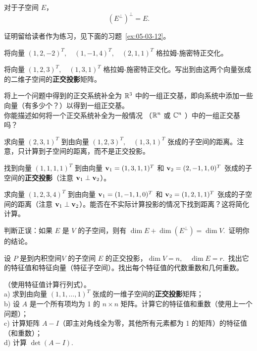 \begin{proposition}\label{stmt:05-03-06}
对于子空间 $E$，$$(E^\perp)^\perp = E.$$
\end{proposition}

证明留给读者作为练习，见下面的习题~\ref{ex:05-03-12}。

\begin{problemset}
\item \label{ex:05-03-01} 将向量 $(1, 2, -2)^T, \quad (1, -1, 4)^T, \quad (2, 1, 1)^T$ 格拉姆-施密特正交化。
\item \label{ex:05-03-02} 将向量 $(1, 2, 3)^T, \quad (1, 3, 1)^T$ 格拉姆-施密特正交化。写出到由这两个向量张成的二维子空间的\textbf{正交投影}矩阵。
\item \label{ex:05-03-03} 将上一个问题中得到的正交系统补全为 $\mathbb{R}^3$ 中的一组正交基，即向系统中添加一些向量（有多少个？）以得到一组正交基。
\\
你能描述如何将一个正交系统补全为一般情况 （$\mathbb{R}^n$ 或 $\mathbb{C}^n$ ）中的一组正交基吗？
\item \label{ex:05-03-04} 求向量 $(2, 3, 1)^T$ 到由向量 $(1, 2, 3)^T, \quad (1, 3, 1)^T$ 张成的子空间的距离。注意，只计算到子空间的距离，而不是正交投影。
\item \label{ex:05-03-05} 找到向量 $(1, 1, 1, 1)^T$ 到由向量 $\mathbf{v}_1 = (1, 3, 1, 1)^T$ 和 $\mathbf{v}_2 = (2, -1, 1, 0)^T$ 张成的子空间的\textbf{正交投影}（注意 $\mathbf{v}_1 \perp \mathbf{v}_2$）。
\item \label{ex:05-03-06} 求向量 $(1, 2, 3, 4)^T$ 到由向量 $\mathbf{v}_1 = (1, -1, 1, 0)^T$ 和 $\mathbf{v}_2 = (1, 2, 1, 1)^T$ 张成的子空间的距离（注意 $\mathbf{v}_1 \perp \mathbf{v}_2$）。能否在不实际计算投影的情况下找到距离？这将简化计算。
\item \label{ex:05-03-07} 判断正误：如果 $E$ 是 $V$ 的子空间，则有 $\dim E + \dim(E^\perp) = \dim V$.~证明你的结论。
\item \label{ex:05-03-08} 设 $P$ 是到内积空间$V$ 的子空间 $E$ 的正交投影，$\dim V = n, \quad \dim E = r$.~找出它的特征值和特征向量（特征子空间）。找出每个特征值的代数重数和几何重数。
\item \label{ex:05-03-09} （使用特征值计算行列式）。
\\
a) 求到由向量 $(1, 1, \dots, 1)^T$ 张成的一维子空间的\textbf{正交投影}矩阵；
\\
b) 设 $A$ 是一个所有项均为 1 的 $n \times n$ 矩阵。计算它的特征值和重数（使用上一个问题）；
\\
c) 计算矩阵 $A-I$（即主对角线全为零，其他所有元素都为 1 的矩阵）的特征值（和重数）；
\\
d) 计算 $\det(A-I)$.~

\end{problemset}
